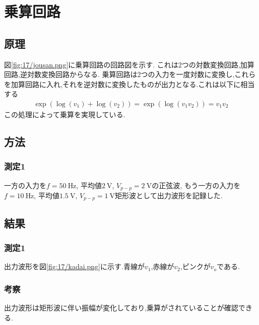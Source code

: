 \section{乗算回路}
\subsection{原理}
図\ref{fig:17/jousan.png}に乗算回路の回路図を示す.
これは2つの対数変換回路,加算回路,逆対数変換回路からなる.
乗算回路は2つの入力を一度対数に変換し,これらを加算回路に入れ,それを逆対数に変換したものが出力となる.これは以下に相当する
\begin{align}
  \exp(\log(v_1)+\log(v_2))=\exp(\log(v_1v_2))=v_1v_2
\end{align}
この処理によって乗算を実現している.
\subsection{方法}
\subsubsection{測定1}
一方の入力を$f=50\ \si{\hertz}$, 平均値$2\ \si{\volt}$, $V_{p-p}=2\ \si{\volt}$の正弦波,
もう一方の入力を$f=10\ \si{\hertz}$, 平均値$1.5\ \si{\volt}$, $V_{p-p}=1\ \si{\volt}$矩形波として出力波形を記録した.
\subsection{結果}
\subsubsection{測定1}
出力波形を図\ref{fig:17/kadai.png}に示す.青線が$v_1$,赤線が$v_2$,ピンクが$v_o$である.
\subsubsection{考察}
出力波形は矩形波に伴い振幅が変化しており,乗算がされていることが確認できる.